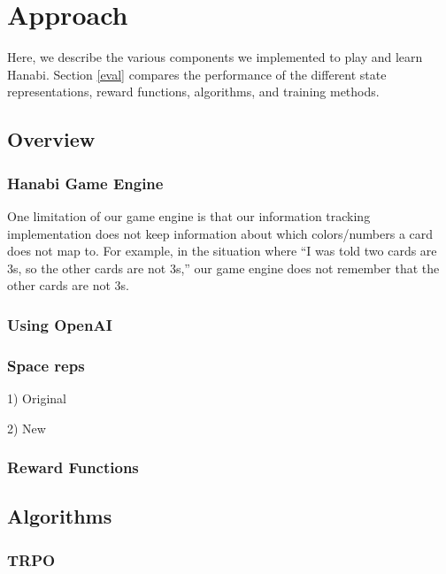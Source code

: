\section{Approach}
\label{approach}

Here, we describe the various components we implemented to play and learn
Hanabi. Section \ref{eval} compares the performance of the different
state representations, reward functions, algorithms, and training
methods.

\subsection{Overview}

\subsubsection{Hanabi Game Engine}

One limitation of our game engine is that our information tracking
implementation does not keep information about which colors/numbers a card
does not map to. For example, in the situation where ``I was told two cards
are 3s, so the other cards are not 3s,'' our game engine does not remember that
the other cards are not 3s.

\subsubsection{Using OpenAI}

\subsubsection{Space reps}

1) Original

2) New

\subsubsection{Reward Functions}

\subsection{Algorithms}

\subsubsection{TRPO}

\cite{TRPO}

